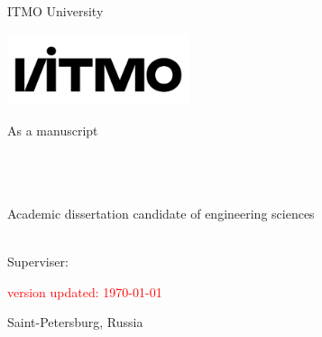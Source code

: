 \thispagestyle{empty}

\vspace{0pt plus2fill} %
\begin{center}
	ITMO University
\end{center}
\begin{minipage}{16cm}
	\includegraphics[width=0.4\textwidth]{images/itmo/logo_osnovnoy_russkiy_chernyy}
	\hfill
\end{minipage}

\hfill As a manuscript

\vspace*{60pt}
\begin{center}
	\textbf {\large
		\PhDStudent
	} \\
	\vspace*{6pt}
	\textbf{{\huge 
		\ThesisName
	}} \\
	\vspace*{6pt}
	\MySpeciality \\
	\vspace*{6pt}
	Academic dissertation candidate of engineering sciences \\ \ \\ 
	\vspace*{40pt}
	\begin{flushright}
		Superviser:\\ \MySuperviser
	\end{flushright}
\end{center}

\vspace*{10pt}
\begin{center} %
	\textcolor{red}{\tiny {version updated: \today}}
\end{center}

\vfill
\begin{center}
	Saint-Petersburg, Russia\\
	\the\year{}%
\end{center}


\OnehalfSpacing
